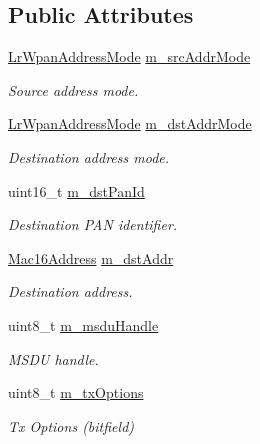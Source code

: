 \subsection*{Public Attributes}
\begin{DoxyCompactItemize}
\item 
\hyperlink{group__lr-wpan_ga9ea4702ab11d5329e1593afebce06bbb}{Lr\+Wpan\+Address\+Mode} \hyperlink{structns3_1_1McpsDataRequestParams_a31f4c281d07cf3b5992d45416bd71309}{m\+\_\+src\+Addr\+Mode}
\begin{DoxyCompactList}\small\item\em Source address mode. \end{DoxyCompactList}\item 
\hyperlink{group__lr-wpan_ga9ea4702ab11d5329e1593afebce06bbb}{Lr\+Wpan\+Address\+Mode} \hyperlink{structns3_1_1McpsDataRequestParams_a5c5e8dd4d08bfcd24de430d38ea7cd78}{m\+\_\+dst\+Addr\+Mode}
\begin{DoxyCompactList}\small\item\em Destination address mode. \end{DoxyCompactList}\item 
uint16\+\_\+t \hyperlink{structns3_1_1McpsDataRequestParams_a6695c180dec55fbd39f883052040e003}{m\+\_\+dst\+Pan\+Id}
\begin{DoxyCompactList}\small\item\em Destination P\+AN identifier. \end{DoxyCompactList}\item 
\hyperlink{classns3_1_1Mac16Address}{Mac16\+Address} \hyperlink{structns3_1_1McpsDataRequestParams_a68e918ac117d0fe43d6b9541ae4347c5}{m\+\_\+dst\+Addr}
\begin{DoxyCompactList}\small\item\em Destination address. \end{DoxyCompactList}\item 
uint8\+\_\+t \hyperlink{structns3_1_1McpsDataRequestParams_a90a54f9a082876ebe872538c8b1ce6bc}{m\+\_\+msdu\+Handle}
\begin{DoxyCompactList}\small\item\em M\+S\+DU handle. \end{DoxyCompactList}\item 
uint8\+\_\+t \hyperlink{structns3_1_1McpsDataRequestParams_ad20ec674a277222812523b3ebbc18d4c}{m\+\_\+tx\+Options}
\begin{DoxyCompactList}\small\item\em Tx Options (bitfield) \end{DoxyCompactList}\end{DoxyCompactItemize}


